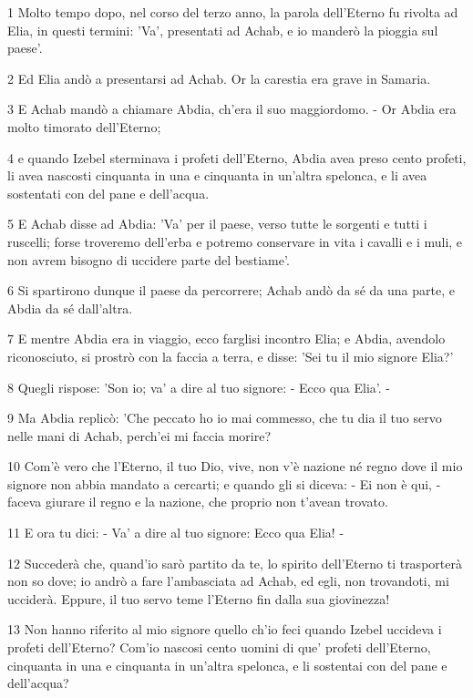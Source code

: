 \par 1 Molto tempo dopo, nel corso del terzo anno, la parola dell'Eterno fu rivolta ad Elia, in questi termini: 'Va', presentati ad Achab, e io manderò la pioggia sul paese'.
\par 2 Ed Elia andò a presentarsi ad Achab. Or la carestia era grave in Samaria.
\par 3 E Achab mandò a chiamare Abdia, ch'era il suo maggiordomo. - Or Abdia era molto timorato dell'Eterno;
\par 4 e quando Izebel sterminava i profeti dell'Eterno, Abdia avea preso cento profeti, li avea nascosti cinquanta in una e cinquanta in un'altra spelonca, e li avea sostentati con del pane e dell'acqua.
\par 5 E Achab disse ad Abdia: 'Va' per il paese, verso tutte le sorgenti e tutti i ruscelli; forse troveremo dell'erba e potremo conservare in vita i cavalli e i muli, e non avrem bisogno di uccidere parte del bestiame'.
\par 6 Si spartirono dunque il paese da percorrere; Achab andò da sé da una parte, e Abdia da sé dall'altra.
\par 7 E mentre Abdia era in viaggio, ecco farglisi incontro Elia; e Abdia, avendolo riconosciuto, si prostrò con la faccia a terra, e disse: 'Sei tu il mio signore Elia?'
\par 8 Quegli rispose: 'Son io; va' a dire al tuo signore: - Ecco qua Elia'. -
\par 9 Ma Abdia replicò: 'Che peccato ho io mai commesso, che tu dia il tuo servo nelle mani di Achab, perch'ei mi faccia morire?
\par 10 Com'è vero che l'Eterno, il tuo Dio, vive, non v'è nazione né regno dove il mio signore non abbia mandato a cercarti; e quando gli si diceva: - Ei non è qui, - faceva giurare il regno e la nazione, che proprio non t'avean trovato.
\par 11 E ora tu dici: - Va' a dire al tuo signore: Ecco qua Elia! -
\par 12 Succederà che, quand'io sarò partito da te, lo spirito dell'Eterno ti trasporterà non so dove; io andrò a fare l'ambasciata ad Achab, ed egli, non trovandoti, mi ucciderà. Eppure, il tuo servo teme l'Eterno fin dalla sua giovinezza!
\par 13 Non hanno riferito al mio signore quello ch'io feci quando Izebel uccideva i profeti dell'Eterno? Com'io nascosi cento uomini di que' profeti dell'Eterno, cinquanta in una e cinquanta in un'altra spelonca, e li sostentai con del pane e dell'acqua?
